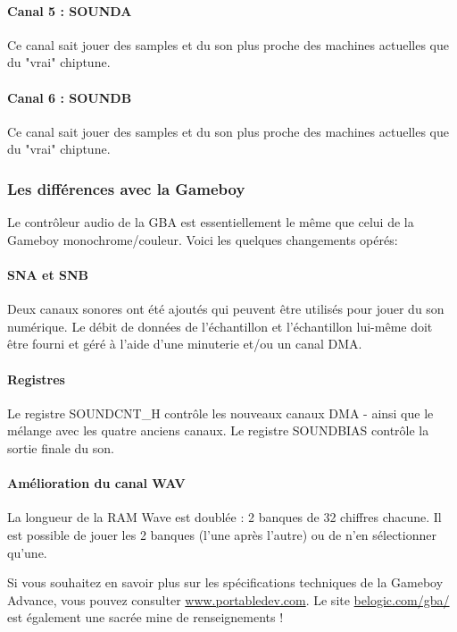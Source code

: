 \paragraph{Canal 5 : SOUNDA} Ce canal sait jouer des samples et du son plus proche des machines actuelles que du "vrai" chiptune.

\paragraph{Canal 6 : SOUNDB} Ce canal sait jouer des samples et du son plus proche des machines actuelles que du "vrai" chiptune.


\subsubsection{Les différences avec la Gameboy}

Le contrôleur audio de la GBA est essentiellement le même que celui de la Gameboy monochrome/couleur.
Voici les quelques changements opérés:

\paragraph{SNA et SNB} Deux canaux sonores ont été ajoutés qui peuvent être utilisés pour jouer du son numérique.
                      Le débit de données de l'échantillon et l'échantillon lui-même doit être fourni et géré à l'aide d'une minuterie et/ou un canal DMA.

\paragraph{Registres} Le registre SOUNDCNT\_H contrôle les nouveaux canaux DMA - ainsi que le mélange avec les quatre anciens canaux.
                      Le registre SOUNDBIAS contrôle la sortie finale du son.

\paragraph{Amélioration du canal WAV} La longueur de la RAM Wave est doublée : 2 banques de 32 chiffres chacune.
                      Il est possible de jouer les 2 banques (l'une après l'autre) ou de n'en sélectionner qu'une.

\medskip
Si vous souhaitez en savoir plus sur les spécifications techniques de la Gameboy Advance,
vous pouvez consulter \href{http://www.portabledev.com/media/GBA/tutoriels/gbatek.htm}{www.portabledev.com}.
Le site \href{http://belogic.com/gba/}{belogic.com/gba/} est également une sacrée mine de renseignements !
